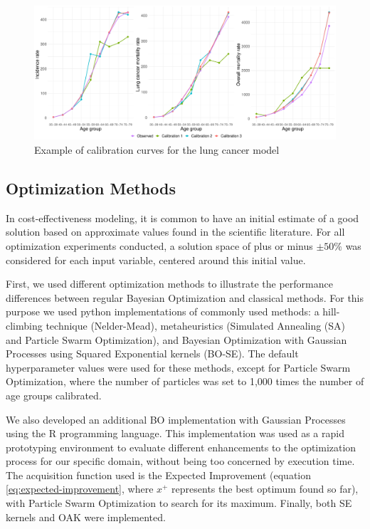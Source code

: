 \documentclass[sn-mathphys,Numbered]{sn-jnl}%
\begin{document}
\begin{figure}[h!]
	\centering	
	\includegraphics[width=\textwidth]{figs/calibration-curves.pdf}		
	\caption{Example of calibration curves for the lung cancer model}	
	\label{fig:calibration-curve}	
\end{figure}

\subsection{Optimization Methods}
In cost-effectiveness modeling, it is common to have an initial estimate of a good solution based on approximate values found in the scientific literature. For all optimization experiments conducted, a solution space of plus or minus $\pm 50\%$ was considered for each input variable, centered around this initial value.

First, we used different optimization methods to illustrate the performance differences between regular Bayesian Optimization and classical methods. For this purpose we used python implementations of commonly used methods: a hill-climbing technique (Nelder-Mead\cite{nelder-mead}), metaheuristics (Simulated Annealing (SA)\cite{simulated-annealing} and Particle Swarm Optimization\cite{pso}), and Bayesian Optimization with Gaussian Processes using Squared Exponential kernels (BO-SE). The default hyperparameter values were used for these methods, except for Particle Swarm Optimization, where the number of particles was set to 1,000 times the number of age groups calibrated.

We also developed an additional BO implementation with Gaussian Processes using the R programming language. This implementation was used as a rapid prototyping environment to evaluate different enhancements to the optimization process for our specific domain, without being too concerned by execution time. The acquisition function used is the Expected Improvement (equation \ref{eq:expected-improvement}, where $x^+$ represents the best optimum found so far), with Particle Swarm Optimization to search for its maximum. Finally, both SE kernels and OAK were implemented.
\end{document}
